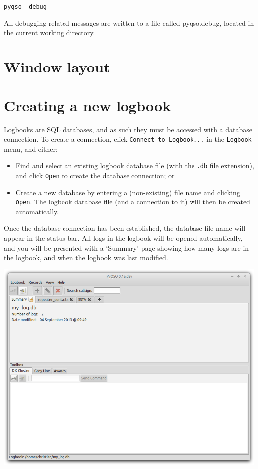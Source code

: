 \documentclass[11pt, a4paper]{report}
\begin{document}
  \texttt{pyqso --debug}

\noindent All debugging-related messages are written to a file called pyqso.debug, located in the current working directory.


\section{Window layout}



\section{Creating a new logbook}
Logbooks are SQL databases, and as such they must be accessed with a database connection. To create a connection, click \texttt{Connect to Logbook...} in the \texttt{Logbook} menu, and either:
\begin{itemize}
  \item Find and select an existing logbook database file (with the \texttt{.db} file extension), and click \texttt{Open} to create the database connection; or
  \item Create a new database by entering a (non-existing) file name and clicking \texttt{Open}. The logbook database file (and a connection to it) will then be created automatically.
\end{itemize}
Once the database connection has been established, the database file name will appear in the status bar. All logs in the logbook will be opened automatically, and you will be presented with a `Summary' page showing how many logs are in the logbook, and when the logbook was last modified.

\begin{center}
  \includegraphics[width=1\columnwidth]{images/summary.png}
\end{center}
\end{document}
